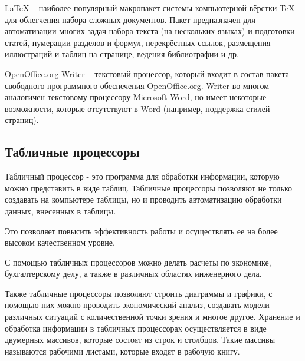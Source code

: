 \documentclass[a4paper]{article}
\begin{document}
LaTeX – наиболее популярный макропакет системы компьютерной вёрстки TeX для облегчения набора сложных документов. Пакет предназначен для автоматизации многих задач набора текста (на нескольких языках) и подготовки статей, нумерации разделов и формул, перекрёстных ссылок, размещения иллюстраций и таблиц на странице, ведения библиографии и др.

OpenOffice.org Writer – текстовый процессор, который входит в состав пакета свободного программного обеспечения OpenOffice.org. Writer во многом аналогичен текстовому процессору Microsoft Word, но имеет некоторые возможности, которые отсутствуют в Word (например, поддержка стилей страниц).

\subsection{Табличные процессоры}
Табличный процессор - это программа для обработки информации, которую можно представить в виде таблиц. Табличные процессоры позволяют не только создавать на компьютере таблицы, но и проводить автоматизацию обработки данных, внесенных в таблицы.

Это позволяет повысить эффективность работы и осуществлять ее на более высоком качественном уровне.

С помощью табличных процессоров можно делать расчеты по экономике, бухгалтерскому делу, а также в различных областях инженерного дела.

Также табличные процессоры позволяют строить диаграммы и графики, с помощью них можно проводить экономический анализ, создавать модели различных ситуаций с количественной точки зрения и многое другое. Хранение и обработка информации в табличных процессорах осуществляется в виде двумерных массивов, которые состоят из строк и столбцов. Такие массивы называются рабочими листами, которые входят в рабочую книгу.
\end{document}
